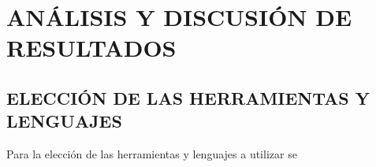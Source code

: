 \thispagestyle{empty}

\section{ANÁLISIS Y DISCUSIÓN DE RESULTADOS}

\subsection{ELECCIÓN DE LAS HERRAMIENTAS Y LENGUAJES}
    Para la elección de las herramientas y lenguajes a utilizar se




